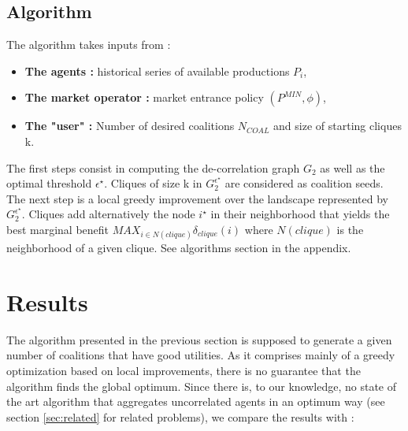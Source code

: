 \documentclass[journal]{IEEEtran}
\begin{document}
\subsection{Algorithm}
The algorithm takes inputs from :

\begin{itemize}
	\item \textbf{The agents :} historical series of available productions $P_{i}$, 
	\item \textbf{The market operator :} market entrance policy $ (P^{MIN},\phi) $,
	\item \textbf{The "user" :} Number of desired coalitions $ N_{COAL} $ and size of starting cliques k.
\end{itemize} 

The first steps consist in computing the de-correlation graph $ G_{2} $ as well as the optimal threshold $ \epsilon^{\star} $. Cliques of size k in $ G_{2}^{\epsilon^{\star}} $ are considered as coalition seeds. The next step is a local greedy improvement over the landscape represented by  $ G_{2}^{\epsilon^{\star}} $. Cliques add alternatively the node $ i^{\star} $ in their neighborhood that yields the best marginal benefit $ MAX_{ i \in N(clique) } \delta_{clique}(i) $ where $ N(clique) $ is the neighborhood of a given clique. See algorithms section in the appendix.


%
%
\section{Results}
\label{sec:results}

The algorithm presented in the previous section is supposed to generate a given number of coalitions that have good utilities. As it comprises mainly of a greedy optimization based on local improvements, there is no guarantee that the algorithm finds the global optimum. Since there is, to our knowledge, no state of the art algorithm that aggregates uncorrelated agents in an optimum way (see section \ref{sec:related} for related problems), we compare the results with :
\end{document}
